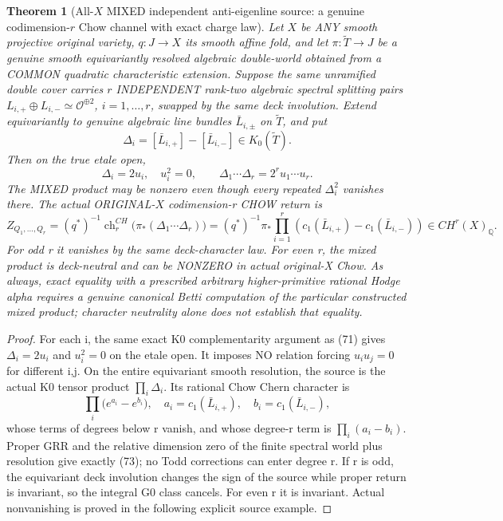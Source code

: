 \documentclass[11pt]{article}
\newtheorem{theorem}{Theorem}[section]
\begin{document}
\begin{theorem}[All-$X$ MIXED independent anti-eigenline source:
a genuine codimension-$r$ Chow channel with exact charge law]
Let $X$ be ANY smooth projective
original variety, $q:J\to X$
its smooth affine fold,
and let $\pi:\widetilde T\to J$
be a genuine smooth equivariantly
resolved algebraic double-world
obtained from a COMMON quadratic
characteristic extension.
Suppose the same unramified
double cover carries $r$
INDEPENDENT rank-two algebraic
spectral splitting pairs
$L_{i,+}\oplus L_{i,-}\simeq
  \mathcal O^{\oplus2}$,
$i=1,\ldots,r$, swapped by
the same deck involution.
Extend equivariantly to
genuine algebraic line bundles
$\bar L_{i,\pm}$ on
$\widetilde T$, and put
\[
 \Delta_i=[\bar L_{i,+}]
                 -[\bar L_{i,-}]
       \in K_0(\widetilde T).
\]
Then on the true etale open,
\[
 \boxed{
 \Delta_i=2u_i,\quad u_i^2=0,\qquad
 \Delta_1\cdots\Delta_r
          =2^r u_1\cdots u_r .}             \tag{72}
\]
The MIXED product may be nonzero
even though every repeated
$\Delta_i^2$ vanishes there.
The actual ORIGINAL-$X$
codimension-r CHOW return is
\[
 \boxed{
 Z_{Q_1,\ldots,Q_r}
  =(q^*)^{-1}\operatorname{ch}_r^{CH}
       \bigl(\pi_*(\Delta_1\cdots\Delta_r)\bigr)
  =(q^*)^{-1}\pi_*
       \prod_{i=1}^{r}
       (c_1(\bar L_{i,+})
                -c_1(\bar L_{i,-}))
       \in CH^r(X)_{\mathbb Q}.}             \tag{73}
\]
For odd r it vanishes by the
same deck-character law.
For even r, the mixed product
is deck-neutral and can be
NONZERO in actual original-X
Chow. As always, exact equality
with a prescribed arbitrary
higher-primitive rational
Hodge alpha requires a genuine
canonical Betti computation
of the particular constructed
mixed product; character
neutrality alone does not
establish that equality.
\end{theorem}
\begin{proof}
For each i, the same exact
K0 complementarity argument
as (71) gives $\Delta_i=2u_i$
and $u_i^2=0$ on the etale
open. It imposes NO relation
forcing $u_iu_j=0$ for
different i,j.
On the entire equivariant
smooth resolution, the
source is the actual K0
tensor product
$\prod_i\Delta_i$.
Its rational Chow Chern
character is
\[
 \prod_i
  \big(e^{a_i}-e^{b_i}\big),
 \quad a_i=c_1(\bar L_{i,+}),
 \quad b_i=c_1(\bar L_{i,-}),
\]
whose terms of degrees below r
vanish, and whose degree-r
term is $\prod_i(a_i-b_i)$.
Proper GRR and the relative
dimension zero of the finite
spectral world plus resolution
give exactly (73); no Todd
corrections can enter degree r.
If r is odd, the equivariant
deck involution changes the
sign of the source while
proper return is invariant,
so the integral G0 class
cancels. For even r it is
invariant. Actual
nonvanishing is proved
in the following explicit
source example.
\end{proof}
\end{document}
